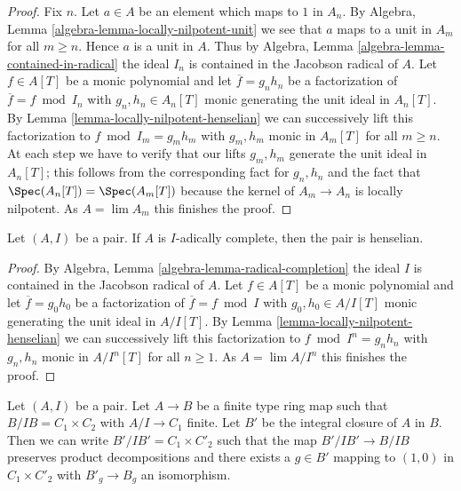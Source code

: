 \begin{proof}
Fix $n$. Let $a \in A$ be an element which maps to $1$ in $A_n$.
By Algebra, Lemma \ref{algebra-lemma-locally-nilpotent-unit}
we see that $a$ maps to a unit in $A_m$ for all $m \geq n$.
Hence $a$ is a unit in $A$. Thus by
Algebra, Lemma \ref{algebra-lemma-contained-in-radical}
the ideal $I_n$ is contained in the Jacobson radical of $A$.
Let $f \in A[T]$ be a monic polynomial and let
$\overline{f} = g_nh_n$ be a factorization
of $\overline{f} = f \bmod I_n$ with $g_n, h_n \in A_n[T]$ monic
generating the unit ideal in $A_n[T]$. By
Lemma \ref{lemma-locally-nilpotent-henselian}
we can successively lift this factorization to
$f \bmod I_m = g_m h_m$ with $g_m, h_m$ monic
in $A_m[T]$ for all $m \geq n$. At each step we have
to verify that our lifts $g_m, h_m$ generate the unit ideal in
$A_n[T]$; this follows from the corresponding fact for
$g_n, h_n$ and the fact that $\Spec(A_n[T]) = \Spec(A_m[T])$
because the kernel of $A_m \to A_n$ is locally nilpotent.
As $A = \lim A_m$ this finishes the proof.
\end{proof}

\begin{lemma}
\label{lemma-complete-henselian}
Let $(A, I)$ be a pair. If $A$ is $I$-adically complete, then
the pair is henselian.
\end{lemma}

\begin{proof}
By Algebra, Lemma \ref{algebra-lemma-radical-completion}
the ideal $I$ is contained in the Jacobson radical of $A$.
Let $f \in A[T]$ be a monic polynomial and let
$\overline{f} = g_0h_0$ be a factorization
of $\overline{f} = f \bmod I$ with $g_0, h_0 \in A/I[T]$ monic
generating the unit ideal in $A/I[T]$. By
Lemma \ref{lemma-locally-nilpotent-henselian}
we can successively lift this factorization to
$f \bmod I^n = g_n h_n$ with $g_n, h_n$ monic
in $A/I^n[T]$ for all $n \geq 1$.
As $A = \lim A/I^n$ this finishes the proof.
\end{proof}

\begin{lemma}
\label{lemma-helper-finite-type}
Let $(A, I)$ be a pair. Let $A \to B$ be a finite type ring map
such that $B/IB = C_1 \times C_2$ with $A/I \to C_1$ finite.
Let $B'$ be the integral closure of $A$ in $B$.
Then we can write $B'/IB' = C_1 \times C'_2$ such that
the map $B'/IB' \to B/IB$ preserves product decompositions
and there exists a $g \in B'$ mapping to $(1, 0)$ in
$C_1 \times C'_2$ with $B'_g \to B_g$ an isomorphism.
\end{lemma}

